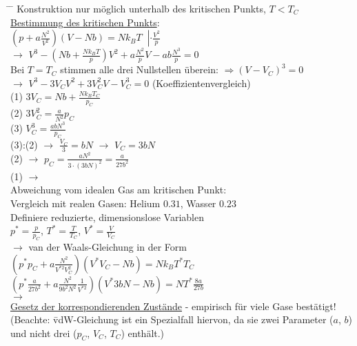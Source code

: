 \begin{tabbing}
\hspace{4em} \= \hspace{4em} \= \kill
Konstruktion nur möglich unterhalb des kritischen Punkts, $T<T_C$\\
\underline{Bestimmung des kritischen Punkts}:\\
$\left(p + a\frac{N^2}{V^2}\right)(V -N b) = N k_B T\;\;\left|\cdot\frac{V^2}{p}\right.$\\
$\rightarrow$\> $V^3 - \left(N b + \frac{N k_B T}{p}\right)V^2 + a \frac{N^2}{p} V - a b \frac{N^3}{p} = 0$\\
Bei $T = T_C$ stimmen alle drei Nullstellen überein: $\Rightarrow \left(V - V_C\right)^3 = 0$\\
$\rightarrow$\> $V^3 - 3 V_C V^2 + 3 V_C^2 V - V_C^3 = 0$ (Koeffizientenvergleich)\\
(1)\> $3V_C = N b + \frac{N k_B T_C}{p_C}$\\
(2)\> $3V_C^2 = \frac{a}{N^2}{p_C}$\\
(3)\> $V_C^3 = \frac{a b N^3}{p_C}$\\
(3):(2) $\rightarrow$\> $\frac{V_C}{3} = b N$ $\rightarrow$ $V_C = 3 b N$\\
(2) $\rightarrow$\> $p_C = \frac{a N^2}{3\cdot(3 b N)^2} = \frac{a}{27 b^2}$\\
(1) $\rightarrow$\> \\
Abweichung vom idealen Gas am kritischen Punkt:  \\
Vergleich mit realen Gasen: Helium $0.31$, Wasser $0.23$\\
Definiere reduzierte, dimensionslose Variablen\\
$p^{*} = \frac{p}{p_C}$, $T^{*} = \frac{T}{T_C}$, $V^{*} = \frac{V}{V_C}$\\
$\rightarrow$\> van der Waals-Gleichung in der Form\\
\> $\left(p^{*}p_C + a \frac{N^2}{V^{*2}V_C^2}\right)(V^{*}V_C - N b) = N k_B T^{*}T_C$\\
\> $\left(p^{*}\frac{a}{27 b^2} + a\frac{N^2}{9 b^2N^2}\frac{1}{V^{*2}}\right)(V^{*}3 b N - N b) = N T^{*} \frac{8 a}{27 b}$\\
$\rightarrow$\> \\
\underline{Gesetz der korrespondierenden Zustände} - empirisch für viele Gase bestätigt!\\
(Beachte: \= vdW-Gleichung ist ein Spezialfall hiervon, da sie zwei Parameter ($a$, $b$)\\\> und nicht drei ($p_C$, $V_C$, $T_C$) enthält.)\\
\end{tabbing}


